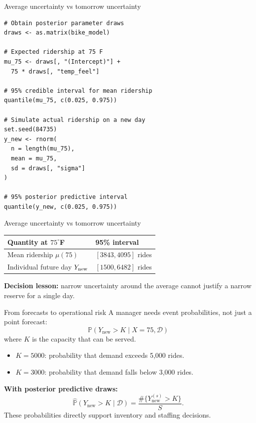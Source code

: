 \documentclass[aspectratio=43,11pt]{beamer}
\newcommand{\Prob}{\mathbb{P}}
\newcommand{\dd}{\mathcal D}
\begin{document}
\begin{frame}[fragile]{Average uncertainty vs tomorrow uncertainty}
\footnotesize
\begin{verbatim}
# Obtain posterior parameter draws
draws <- as.matrix(bike_model)

# Expected ridership at 75 F
mu_75 <- draws[, "(Intercept)"] +
  75 * draws[, "temp_feel"]

# 95% credible interval for mean ridership
quantile(mu_75, c(0.025, 0.975))

# Simulate actual ridership on a new day
set.seed(84735)
y_new <- rnorm(
  n = length(mu_75),
  mean = mu_75,
  sd = draws[, "sigma"]
)

# 95% posterior predictive interval
quantile(y_new, c(0.025, 0.975))
\end{verbatim}
\end{frame}

\begin{frame}{Average uncertainty vs tomorrow uncertainty}
\centering\small
\begin{tabular}{p{4.3cm}p{4.8cm}}
\toprule Quantity at $75^\circ$F & 95\% interval\\\midrule
Mean ridership $\mu(75)$ & $[3843,4095]$ rides\\
Individual future day $Y_{\rm new}$ & $[1500,6482]$ rides\\\bottomrule
\end{tabular}

\vspace{1cm}

\par\medskip\textbf{Decision lesson:} narrow uncertainty around the average cannot justify a narrow reserve for a single day.
\end{frame}

\begin{frame}{From forecasts to operational risk}
A manager needs event probabilities, not just a point forecast:
\[\Prob(Y_{\mathrm{new}}>K\mid X=75,\dd)\]
where $K$ is the capacity that can be served.

\begin{itemize}
\item $K=5000$: probability that demand exceeds 5,000 rides.
\item $K=3000$: probability that demand falls below 3,000 rides.
\end{itemize}
\par\medskip
\textbf{With posterior predictive draws:}
\[\widehat{\Prob}(Y_{\mathrm{new}}>K\mid\dd)=\frac{\#\{Y_{\mathrm{new}}^{(s)}>K\}}{S}.\]
These probabilities directly support inventory and staffing decisions.
\end{frame}
\end{document}
